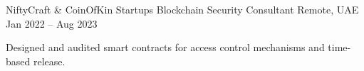 \begin{cventries}
  \cventry
  {NiftyCraft \& CoinOfKin Startups} %
  {Blockchain Security Consultant} %
  {Remote, UAE} %
  {Jan 2022 -- Aug 2023} %
  {
    \begin{cvitems} %
      \item {Designed and audited smart contracts for access control mechanisms and time-based release.}
    \end{cvitems}
  }

  \vspace{-5pt}

\end{cventries}
